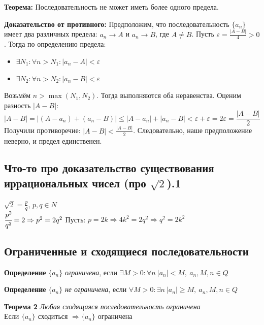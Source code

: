 \documentclass[12pt, a4paper]{article}
\newcommand{\eps}{\varepsilon}
\begin{document}
\begin{tcolorbox}[title=Теорема о единственности предела, breakable]

\textbf{Теорема:} Последовательность не может иметь более одного предела.

\textbf{Доказательство от противного:}
Предположим, что последовательность $\{a_n\}$ имеет два различных предела: $a_n \to A$ и $a_n \to B$, где $A \neq B$.
Пусть $\eps = \frac{|A - B|}{4} > 0$. Тогда по определению предела:
\begin{itemize}
    \item $\exists N_1: \forall n > N_1: |a_n - A| < \eps$
    \item $\exists N_2: \forall n > N_2: |a_n - B| < \eps$
\end{itemize}
Возьмём $n > \max(N_1, N_2)$. Тогда выполняются оба неравенства. Оценим разность $|A - B|$:
$$|A - B| = |(A - a_n) + (a_n - B)| \leq |A - a_n| + |a_n - B| < \eps + \eps = 2\eps = \frac{|A - B|}{2}$$
Получили противоречие: $|A - B| < \frac{|A - B|}{2}$. Следовательно, наше предположение неверно, и предел единственен.
\end{tcolorbox}

\subsection{Что-то про доказательство существования иррациональных чисел (про $\sqrt{2}$).1}

$\sqrt{2} = \frac{p}{q}$, $p, q \in N$\\
$\cfrac{p^2}{q^2} = 2 \Rightarrow p^2 = 2q^2$ Пусть: $p = 2k \Rightarrow 4k^2 = 2q^2 \Rightarrow q^2 = 2k^2$

\newpage
\subsection{Ограниченные и сходящиеся последовательности}

\begin{tcolorbox}
\textbf{Определение}
$\{a_n\}$  \textit{ограничена}, если $\exists M>0: \forall n\ |a_n|<M,\ a_n, M, n \in Q$
\end{tcolorbox}

\begin{tcolorbox}
\textbf{Определение}
$\{a_n\}$  \textit{не ограничена}, если $\forall M>0: \exists n\ |a_n|\geq M,\ a_n, M, n \in Q$ 
\end{tcolorbox}

\begin{tcolorbox}
\textbf{Теорема 2} \textit{Любая сходящаяся последовательность ограничена} \\
Если $\{a_n\}$ сходиться $\Rightarrow \{a_n\}$ ограничена
\end{tcolorbox}
\end{document}
